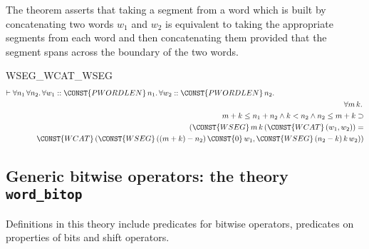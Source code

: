 The theorem  asserts that taking a segment from a
word which is built by concatenating two words $w_1$ and $w_2$ is
equivalent to taking the appropriate segments from each word and then
concatenating them provided that the segment spans across the boundary
of the two words.
\begin{holthm}{WSEG_WCAT_WSEG}
\begin{eqnarray*}
\lefteqn{\THM \FORALL n_{1}\,\FORALL n_{2}\DOT 
        \FORALL w_1 :: \CONST{PWORDLEN} \,n_{1}\DOT
        \FORALL w_2 :: \CONST{PWORDLEN} \,n_{2}\DOT} \\
 & & {} \FORALL m \,k\DOT \\
 & & \quad m + k \LEE  n_{1} + n_{2} \AND k \LES  n_{2} \AND 
                                  n_{2} \LEE  m + k \IMP \\
 & & \qquad (\CONST{WSEG} \,m \,k \,(\CONST{WCAT} \,(w_{1}, w_{2})) = \\
 & & \qquad \quad \CONST{WCAT} \,
        (\CONST{WSEG} \,((m + k) - n_{2}) \,\CONST{0} \,w_{1},
         \CONST{WSEG} \,(n_{2} - k) \,k \,w_{2}))
\end{eqnarray*}
\end{holthm}

\subsection{Generic bitwise operators: the theory {\tt word\_bitop}}

Definitions in this theory include predicates for bitwise operators,
predicates on properties of bits and shift operators.

